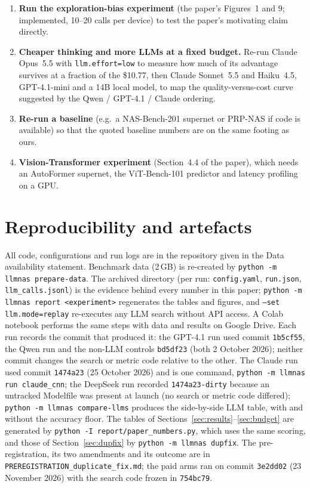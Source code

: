 \documentclass[preprint,12pt]{elsarticle}
\newcommand{\code}[1]{\texttt{#1}}
\begin{document}
\begin{enumerate}
  \item \textbf{Run the exploration-bias experiment} (the paper's Figures~1 and 9; implemented, 10--20 calls per device) to test the paper's motivating claim directly.
  \item \textbf{Cheaper thinking and more LLMs at a fixed budget.} Re-run Claude Opus~5.5 with \code{llm.effort=low} to measure how much of its advantage survives at a fraction of the \$10.77, then Claude Sonnet~5.5 and Haiku~4.5, GPT-4.1-mini and a 14B local model, to map the quality-versus-cost curve suggested by the Qwen / GPT-4.1 / Claude ordering.
  \item \textbf{Re-run a baseline} (e.g.\ a NAS-Bench-201 supernet or PRP-NAS if code is available) so that the quoted baseline numbers are on the same footing as ours.
  \item \textbf{Vision-Transformer experiment} (Section~4.4 of the paper), which needs an AutoFormer supernet, the ViT-Bench-101 predictor and latency profiling on a GPU.
\end{enumerate}

\section{Reproducibility and artefacts}
All code, configurations and run logs are in the repository given in the Data availability statement. Benchmark data (2\,GB) is re-created by \code{python -m llmnas prepare-data}. The archived  directory (per run: \code{config.yaml}, \code{run.json}, \code{llm\_calls.jsonl}) is the evidence behind every number in this paper; \code{python -m llmnas report <experiment>} regenerates the tables and figures, and \code{--set llm.mode=replay} re-executes any LLM search without API access. A Colab notebook performs the same steps with data and results on Google Drive. Each run records the commit that produced it: the GPT-4.1 run used commit \code{1b5cf55}, the Qwen run and the non-LLM controls \code{bd5df23} (both 2 October 2026); neither commit changes the search or metric code relative to the other. The Claude run used commit \code{1474a23} (25 October 2026) and is one command, \code{python -m llmnas run claude\_cnn}; the DeepSeek run recorded \code{1474a23-dirty} because an untracked Modelfile was present at launch (no search or metric code differed); \code{python -m llmnas compare-llms} produces the side-by-side LLM table, with and without the accuracy floor. The tables of Sections~\ref{sec:results}--\ref{sec:budget} are generated by \code{python -I report/paper\_numbers.py}, which uses the same scoring, and those of Section~\ref{sec:dupfix} by \code{python -m llmnas dupfix}. The pre-registration, its two amendments and its outcome are in \code{PREREGISTRATION\_duplicate\_fix.md}; the paid arms ran on commit \code{3e2dd02} (23 November 2026) with the search code frozen in \code{754bc79}.
\end{document}
